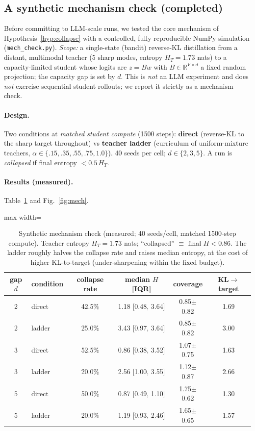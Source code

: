 \documentclass[11pt]{article}
\begin{document}
\subsection{A synthetic mechanism check (completed)}
\label{sec:mech}
Before committing to LLM-scale runs, we tested the core mechanism of Hypothesis~\ref{hyp:collapse} with a controlled, fully reproducible NumPy simulation (\texttt{mech\_check.py}). \emph{Scope:} a single-state (bandit) reverse-KL distillation from a distant, multimodal teacher (5 sharp modes, entropy $H_T{=}1.73$ nats) to a capacity-limited student whose logits are $z{=}Bw$ with $B\in\mathbb{R}^{V\times d}$ a fixed random projection; the capacity gap is set by $d$. This is \emph{not} an LLM experiment and does \emph{not} exercise sequential student rollouts; we report it strictly as a mechanism check.

\paragraph{Design.} Two conditions at \emph{matched student compute} (1500 steps): \textbf{direct} (reverse-KL to the sharp target throughout) vs \textbf{teacher ladder} (curriculum of uniform-mixture teachers, $\alpha\in\{.15,.35,.55,.75,1.0\}$). 40 seeds per cell; $d\in\{2,3,5\}$. A run is \emph{collapsed} if final entropy $<0.5\,H_T$.

\paragraph{Results (measured).} Table~\ref{tab:mech} and Fig.~\ref{fig:mech}.
\begin{table}[h]
\centering
\caption{Synthetic mechanism check (measured; 40 seeds/cell, matched 1500-step compute). Teacher entropy $H_T{=}1.73$ nats; ``collapsed'' $\equiv$ final $H<0.86$. The ladder roughly halves the collapse rate and raises median entropy, at the cost of higher KL-to-target (under-sharpening within the fixed budget).}
\label{tab:mech}
\small
\begin{adjustbox}{max width=\linewidth}
\begin{tabular}{@{}clcccc@{}}
\toprule
\textbf{gap $d$} & \textbf{condition} & \textbf{collapse rate} & \textbf{median $H$ [IQR]} & \textbf{coverage} & \textbf{KL$\to$target} \\
\midrule
2 & direct & 42.5\% & 1.18 [0.48, 3.64] & 0.85$\pm$0.82 & 1.69 \\
2 & ladder & 25.0\% & 3.43 [0.97, 3.64] & 0.85$\pm$0.82 & 3.00 \\
3 & direct & 52.5\% & 0.86 [0.38, 3.52] & 1.07$\pm$0.75 & 1.63 \\
3 & ladder & 20.0\% & 2.56 [1.00, 3.55] & 1.12$\pm$0.87 & 2.66 \\
5 & direct & 50.0\% & 0.87 [0.49, 1.10] & 1.75$\pm$0.62 & 1.30 \\
5 & ladder & 20.0\% & 1.19 [0.93, 2.46] & 1.65$\pm$0.65 & 1.57 \\
\bottomrule
\end{tabular}
\end{adjustbox}
\end{table}
\end{document}
